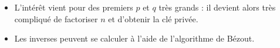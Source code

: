   \begin{remark}
    \begin{itemize}
      \item L'intérêt vient pour des premiers $p$ et $q$ très grands : il devient alors très compliqué de factoriser $n$ et d'obtenir la clé privée.
      \item Les inverses peuvent se calculer à l'aide de l'algorithme de Bézout.
    \end{itemize}
  \end{remark}

